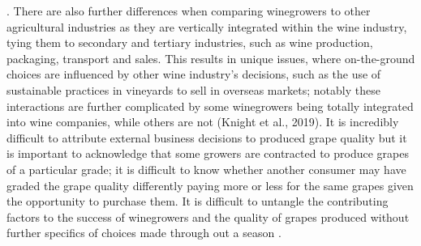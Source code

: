 \documentclass[review,12pt,authoryear]{elsarticle}
\begin{document}
\begin{linenumbers}
%
%
%
%

 . There are also further differences when comparing winegrowers to other agricultural industries as they are vertically integrated within the wine industry, tying them to secondary and tertiary industries, such as wine production, packaging, transport and sales. This results in unique issues, where on-the-ground choices are influenced by other wine industry's decisions, such as the use of sustainable practices in vineyards to sell in overseas markets; notably these interactions are further complicated by some winegrowers being totally integrated into wine companies, while others are not (Knight et al., 2019). 
 It is incredibly difficult to attribute external business decisions to produced grape quality but it is important to acknowledge that some growers are contracted to produce grapes of a particular grade; it is difficult to know whether another consumer may have graded the grape quality differently paying more or less for the same grapes given the opportunity to purchase them.
 It is difficult to untangle the contributing factors to the success of winegrowers and the quality of grapes produced without further specifics of choices made through out a season \autocite{leileiheFruitYieldPrediction2022}.


\end{linenumbers}
\end{document}
